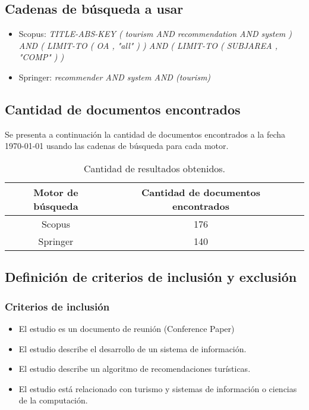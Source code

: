 \documentclass{report}
\begin{document}
\subsection{Cadenas de búsqueda a usar}

\begin{itemize}
    \item{Scopus: \emph{TITLE-ABS-KEY ( tourism  AND recommendation  AND system )  AND  (  LIMIT-TO ( OA ,  "all" ) )  AND  ( LIMIT-TO ( SUBJAREA ,  "COMP" ) ) }}
    \item{Springer: \emph{recommender AND system AND (tourism)}}
\end{itemize}

\subsection{Cantidad de documentos encontrados}

Se presenta a continuación la cantidad de documentos encontrados a la fecha \today{}
usando las cadenas de búsqueda para cada motor.

\begin{table}[h!]
    \centering
    \begin{tabular}{c  c  c}
        \toprule
        Motor de búsqueda & Cantidad de documentos encontrados\\
        \midrule
        Scopus & 176\\
        \midrule
        Springer & 140\\
        \bottomrule
    \end{tabular}
    \caption{Cantidad de resultados obtenidos.}\label{table:cantidad_datos}
\end{table}

\subsection{Definición de criterios de inclusión y exclusión}

\subsubsection{Criterios de inclusión}

\begin{itemize}
    \item{El estudio es un documento de reunión (Conference Paper)}
    \item{El estudio describe el desarrollo de un sistema de información.}
    \item{El estudio describe un algoritmo de recomendaciones turísticas.}
    \item{El estudio está relacionado con turismo y sistemas de información o ciencias de la computación.}
\end{itemize}
\end{document}
